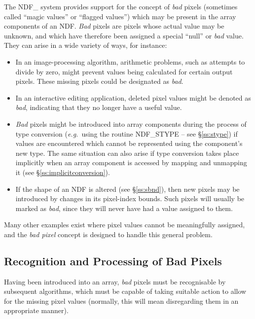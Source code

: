 \documentclass[twoside,11pt]{article}
\newcommand{\htmlref}[2]{#1}
\newcommand{\xlabel}[1]{}
\newcommand{\st}[1]{{\em{#1}}}
\begin{document}
The NDF\_ system provides support for the concept of \st{bad\/} pixels
(sometimes called ``magic values'' or ``flagged values'') which may be present
in the array components of an NDF. 
\st{Bad\/} pixels are pixels whose actual value may be unknown, and which
have therefore been assigned a special ``null'' or \st{bad\/} value. 
They can arise in a wide variety of ways, for instance:

\begin{itemize}

\item
In an image-processing algorithm, arithmetic problems, such as attempts to
divide by zero, might prevent values being calculated for certain output
pixels. 
These missing pixels could be designated as \st{bad}.

\item
In an interactive editing application, deleted pixel values might be denoted as
\st{bad}, indicating that they no longer have a useful value. 

\item
\st{Bad\/} pixels might be introduced into array components during the
process of type conversion (\st{e.g.}\ using the routine \htmlref{NDF\_STYPE}{NDF_STYPE} -- see
\S\ref{ss:stype}) if values are encountered which cannot be represented
using the component's new type. 
The same situation can also arise if type conversion takes place implicitly
when an array component is accessed by mapping and unmapping it (see
\S\ref{ss:implicitconversion}). 

\item
If the shape of an NDF is altered (see \S\ref{ss:sbnd}), then new pixels may
be introduced by changes in its pixel-index bounds. 
Such pixels will usually be marked as \st{bad}, since they will never have
had a value assigned to them. 

\end{itemize}

Many other examples exist where pixel values cannot be meaningfully
assigned, and the \st{bad pixel\/} concept is designed to handle this general
problem. 

\subsection{\xlabel{recognition_and_processing_of_bad_pixels}Recognition and Processing of Bad Pixels}

Having been introduced into an array, \st{bad\/} pixels must be recognisable
by subsequent algorithms, which must be capable of taking suitable action to
allow for the missing pixel values (normally, this will mean disregarding
them in an appropriate manner). 
\end{document}
